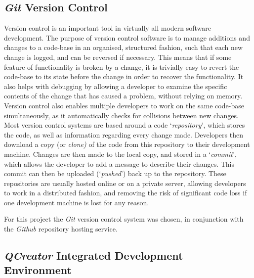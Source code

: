 \subsection{\textit{Git} Version Control}
Version control is an important tool in virtually all modern software development. The purpose of version control software is to manage additions and changes to a code-base in an organised, structured fashion, such that each new change is logged, and can be reversed if necessary. This means that if some feature of functionality is broken by a change, it is trivially easy to revert the code-base to its state before the change in order to recover the functionality. It also helps with debugging by allowing a developer to examine the specific contents of the change that has caused a problem, without relying on memory. Version control also enables multiple developers to work on the same code-base simultaneously, as it automatically checks for collisions between new changes. Most version control systems are based around a code `\textit{repository}', which stores the code, as well as information regarding every change made. Developers then download a copy (or \textit{clone)} of the code from this repository to their development machine. Changes are then made to the local copy, and stored in a `\textit{commit}', which allows the developer to add a message to describe their changes. This commit can then be uploaded (`\textit{pushed}') back up to the repository. These repositories are usually hosted online or on a private server, allowing developers to work in a distributed fashion, and removing the risk of significant code loss if one development machine is lost for any reason.

For this project the \textit{Git} version control system was chosen, in conjunction with the \textit{Github} repository hosting service. 

\subsection{\textit{QCreator} Integrated Development Environment}

